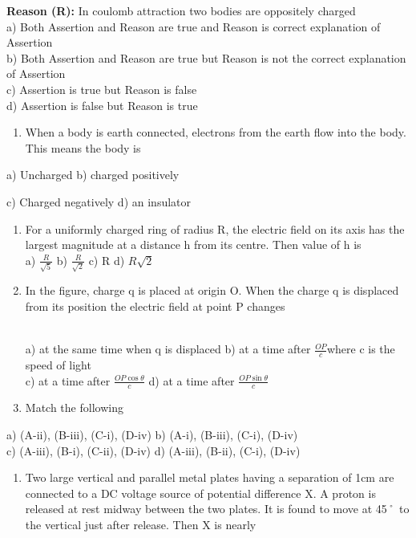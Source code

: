 \textbf{Reason (R):} In coulomb attraction two bodies are oppositely
charged\\
a) Both Assertion and Reason are true and Reason is correct explanation
of Assertion\\
b) Both Assertion and Reason are true but Reason is not the correct
explanation of Assertion\\
c) Assertion is true but Reason is false\\
d) Assertion is false but Reason is true

\begin{enumerate}
\def\labelenumi{\arabic{enumi}.}
\setcounter{enumi}{38}
\item
  When a body is earth connected, electrons from the earth flow into the
  body. This means the body is
\end{enumerate}

a) Uncharged b) charged positively

c) Charged negatively d) an insulator

\begin{enumerate}
\def\labelenumi{\arabic{enumi}.}
\setcounter{enumi}{39}
\item
  For a uniformly charged ring of radius R, the electric field on its
  axis has the largest magnitude at a distance h from its centre. Then
  value of h is\\
  a) \(\frac{R}{\sqrt{5}}\) b) \(\frac{R}{\sqrt{2}}\) c) R d)
  \(R\sqrt{2}\)
\item
  In the figure, charge q is placed at origin O. When the charge q is
  displaced from its position the electric field at point P changes\\
  \strut \\
  a) at the same time when q is displaced b) at a time after
  \(\frac{OP}{c}\)where c is the speed of light\\
  c) at a time after \(\frac{OP\cos\theta}{c}\) d) at a time after
  \(\frac{OP\sin\theta}{c}\)
\item
  Match the following
\end{enumerate}

a) (A-ii), (B-iii), (C-i), (D-iv) b) (A-i), (B-iii), (C-i), (D-iv)\\
c) (A-iii), (B-i), (C-ii), (D-iv) d) (A-iii), (B-ii), (C-i), (D-iv)

\begin{enumerate}
\def\labelenumi{\arabic{enumi}.}
\setcounter{enumi}{42}
\item
  Two large vertical and parallel metal plates having a separation of
  1cm are connected to a DC voltage source of potential difference X. A
  proton is released at rest midway between the two plates. It is found
  to move at 45˚ to the vertical just after release. Then X is nearly
\end{enumerate}

